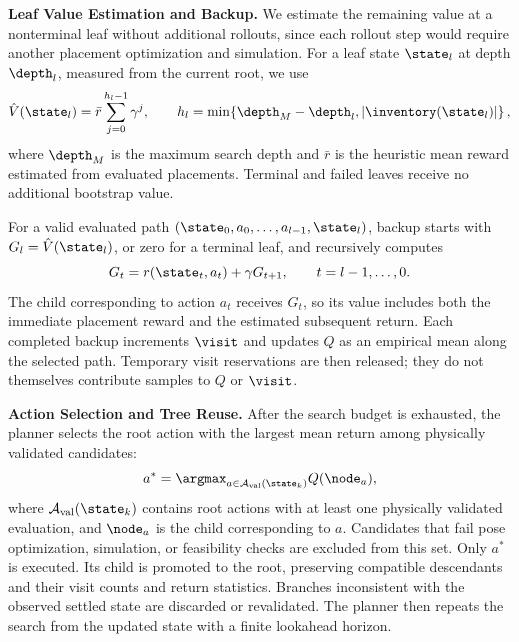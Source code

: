 \noindent \textbf{Leaf Value Estimation and Backup.}
We estimate the remaining value at a nonterminal leaf without additional
rollouts, since each rollout step would require another placement
optimization and simulation. For a leaf state $\state_l$ at depth
$\depth_l$, measured from the current root, we use
\begin{equation*}
    \hat V(\state_l)=\bar r\sum_{j=0}^{h_l-1}\gamma^j,
    \qquad
    h_l=\min\!\left\{\depth_M-\depth_l,|\inventory(\state_l)|\right\},
\end{equation*}
where $\depth_M$ is the maximum search depth and $\bar r$ is the heuristic
mean reward estimated from evaluated placements. Terminal and failed leaves
receive no additional bootstrap value.

For a valid evaluated path $(\state_0,a_0,\ldots,a_{l-1},\state_l)$,
backup starts with $G_l=\hat V(\state_l)$, or zero for a terminal leaf,
and recursively computes
\begin{equation*}
    G_t=r(\state_t,a_t)+\gamma G_{t+1},
    \qquad t=l-1,\ldots,0.
\end{equation*}
The child corresponding to action $a_t$ receives $G_t$, so its value
includes both the immediate placement reward and the estimated subsequent
return. Each completed backup increments $\visit$ and updates $Q$ as an
empirical mean along the selected path. Temporary visit reservations are
then released; they do not themselves contribute samples to $Q$ or $\visit$.

\noindent \textbf{Action Selection and Tree Reuse.}
After the search budget is exhausted, the planner selects the root action
with the largest mean return among physically validated candidates:
\begin{equation*}
    a^*=\argmax_{a\in\mathcal{A}_{\mathrm{val}}(\state_k)}Q(\node_a),
\end{equation*}
where $\mathcal{A}_{\mathrm{val}}(\state_k)$ contains root actions with at
least one physically validated evaluation, and $\node_a$ is the child
corresponding to $a$. Candidates that fail pose optimization, simulation,
or feasibility checks are excluded from this set.
Only $a^*$ is executed. Its child is promoted to the root, preserving
compatible descendants and their visit counts and return statistics.
Branches inconsistent with the observed settled state are discarded or
revalidated. The planner then repeats the search from the updated state
with a finite lookahead horizon.
